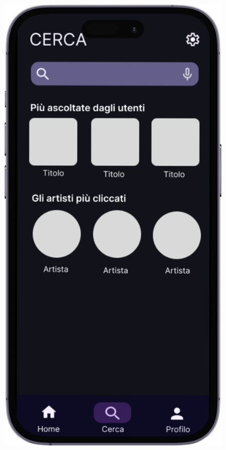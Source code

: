 \documentclass{article}
\begin{document}
\begin{figure}[htbp]
\begin{minipage}{0.18\textwidth}
					\includegraphics[width=\textwidth]{Immagini/foto4}
				\end{minipage}
				\hfill
				\begin{minipage}{0.18\textwidth}

\end{minipage}
\end{figure}
\end{document}

